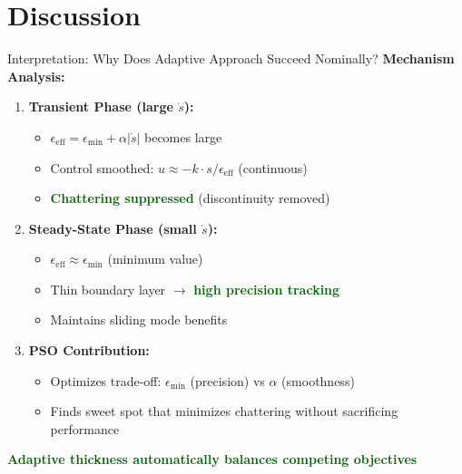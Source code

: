 \documentclass[10pt,aspectratio=169]{beamer}
\newcommand{\emphgreen}[1]{\textcolor{darkgreen}{\textbf{#1}}}
\begin{document}
\section{Discussion}

\begin{frame}{Interpretation: Why Does Adaptive Approach Succeed Nominally?}
\textbf{Mechanism Analysis:}

\begin{enumerate}
    \item \textbf{Transient Phase (large $\dot{s}$):}
    \begin{itemize}
        \item $\epsilon_{\text{eff}} = \epsilon_{\min} + \alpha |\dot{s}|$ becomes large
        \item Control smoothed: $u \approx -k \cdot s/\epsilon_{\text{eff}}$ (continuous)
        \item \emphgreen{Chattering suppressed} (discontinuity removed)
    \end{itemize}

    \item \textbf{Steady-State Phase (small $\dot{s}$):}
    \begin{itemize}
        \item $\epsilon_{\text{eff}} \approx \epsilon_{\min}$ (minimum value)
        \item Thin boundary layer $\rightarrow$ \emphgreen{high precision tracking}
        \item Maintains sliding mode benefits
    \end{itemize}

    \item \textbf{PSO Contribution:}
    \begin{itemize}
        \item Optimizes trade-off: $\epsilon_{\min}$ (precision) vs $\alpha$ (smoothness)
        \item Finds sweet spot that minimizes chattering without sacrificing performance
    \end{itemize}
\end{enumerate}

\vspace{0.3cm}
\centering
\emphgreen{Adaptive thickness automatically balances competing objectives}
\end{frame}
\end{document}
